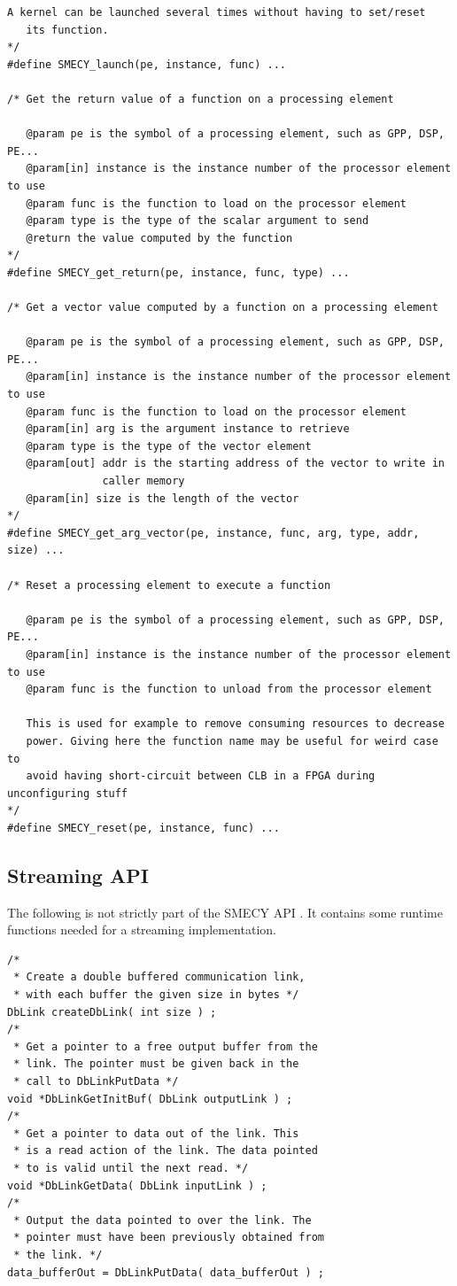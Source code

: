 \documentclass[a4paper]{article}
\begin{document}
\begin{lstlisting}[frame=none,numbers=none]
   A kernel can be launched several times without having to set/reset
   its function.
*/
#define SMECY_launch(pe, instance, func) ...

/* Get the return value of a function on a processing element

   @param pe is the symbol of a processing element, such as GPP, DSP, PE...
   @param[in] instance is the instance number of the processor element to use
   @param func is the function to load on the processor element
   @param type is the type of the scalar argument to send
   @return the value computed by the function
*/
#define SMECY_get_return(pe, instance, func, type) ...

/* Get a vector value computed by a function on a processing element

   @param pe is the symbol of a processing element, such as GPP, DSP, PE...
   @param[in] instance is the instance number of the processor element to use
   @param func is the function to load on the processor element
   @param[in] arg is the argument instance to retrieve
   @param type is the type of the vector element
   @param[out] addr is the starting address of the vector to write in
               caller memory
   @param[in] size is the length of the vector
*/
#define SMECY_get_arg_vector(pe, instance, func, arg, type, addr, size) ...

/* Reset a processing element to execute a function

   @param pe is the symbol of a processing element, such as GPP, DSP, PE...
   @param[in] instance is the instance number of the processor element to use
   @param func is the function to unload from the processor element

   This is used for example to remove consuming resources to decrease
   power. Giving here the function name may be useful for weird case to
   avoid having short-circuit between CLB in a FPGA during unconfiguring stuff
*/
#define SMECY_reset(pe, instance, func) ...
	\end{lstlisting}
	
	\subsection{Streaming API}
	The following is not strictly part of the SMECY API \cite{smec}. It
    contains some runtime functions needed for a streaming implementation.
	\begin{lstlisting}[frame=none, numbers=none]
/*
 * Create a double buffered communication link,
 * with each buffer the given size in bytes */
DbLink createDbLink( int size ) ;
/*
 * Get a pointer to a free output buffer from the
 * link. The pointer must be given back in the
 * call to DbLinkPutData */
void *DbLinkGetInitBuf( DbLink outputLink ) ;
/*
 * Get a pointer to data out of the link. This
 * is a read action of the link. The data pointed
 * to is valid until the next read. */
void *DbLinkGetData( DbLink inputLink ) ;
/*
 * Output the data pointed to over the link. The
 * pointer must have been previously obtained from
 * the link. */
data_bufferOut = DbLinkPutData( data_bufferOut ) ;
	\end{lstlisting} 
\end{document}
